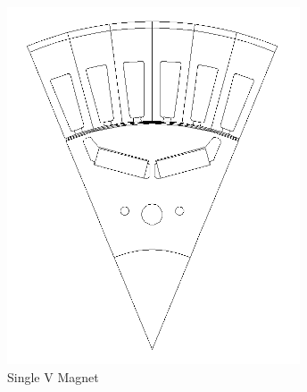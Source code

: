 \documentclass{report} %
\begin{document}
\begin{figure}[H]
    \centering
    \begin{subfigure}{0.32\textwidth}
        \centering
        \includegraphics[width=\textwidth]{./ReportImages/1V_Magnet.png}
        \caption{Single V Magnet}
        \label{fig:V1 Magnet}
    \end{subfigure}\hfill
    \begin{subfigure}{0.32\textwidth}
        \centering

\end{subfigure}
\end{figure}
\end{document}
